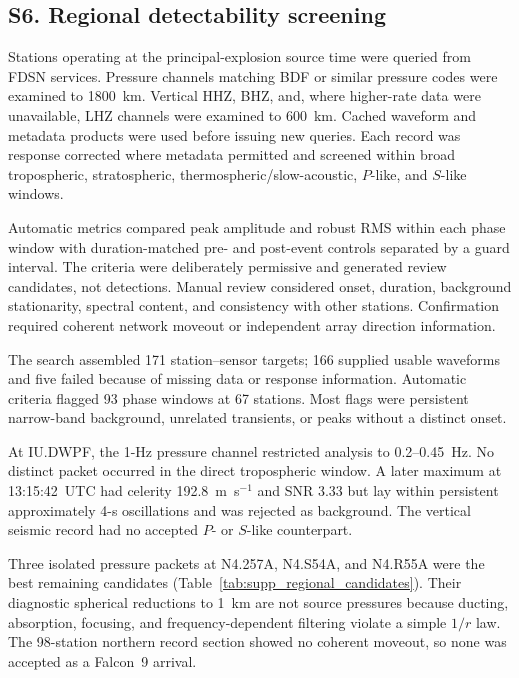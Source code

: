 \documentclass[]{seismica}
\begin{document}
\FloatBarrier
\subsection{S6. Regional detectability screening}
\label{sec:supp_regional}

Stations operating at the principal-explosion source time were queried from
FDSN services. Pressure channels matching BDF or similar pressure codes were
examined to 1800~km. Vertical HHZ, BHZ, and, where higher-rate data were
unavailable, LHZ channels were examined to 600~km. Cached waveform and metadata
products were used before issuing new queries. Each record was response
corrected where metadata permitted and screened within broad tropospheric,
stratospheric, thermospheric/slow-acoustic, $P$-like, and $S$-like windows.

Automatic metrics compared peak amplitude and robust RMS within each phase
window with duration-matched pre- and post-event controls separated by a guard
interval. The criteria were deliberately permissive and generated review
candidates, not detections. Manual review considered onset, duration,
background stationarity, spectral content, and consistency with other
stations. Confirmation required coherent network moveout or independent array
direction information.

The search assembled 171 station--sensor targets; 166 supplied usable
waveforms and five failed because of missing data or response information.
Automatic criteria flagged 93 phase windows at 67 stations. Most flags were
persistent narrow-band background, unrelated transients, or peaks without a
distinct onset.

At IU.DWPF, the 1-Hz pressure channel restricted analysis to 0.2--0.45~Hz. No
distinct packet occurred in the direct tropospheric window. A later maximum at
13:15:42~UTC had celerity 192.8~m~s$^{-1}$ and SNR 3.33 but lay within
persistent approximately 4-s oscillations and was rejected as background. The
vertical seismic record had no accepted $P$- or $S$-like counterpart.

Three isolated pressure packets at N4.257A, N4.S54A, and N4.R55A were the best
remaining candidates (Table~\ref{tab:supp_regional_candidates}). Their
diagnostic spherical reductions to 1~km are not source pressures because
ducting, absorption, focusing, and frequency-dependent filtering violate a
simple $1/r$ law. The 98-station northern record section showed no coherent
moveout, so none was accepted as a Falcon~9 arrival.
\end{document}
